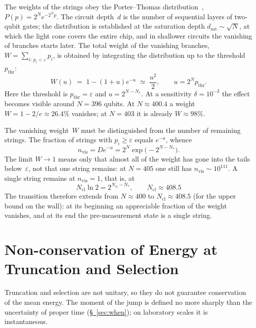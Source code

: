 \documentclass[11pt,a4paper]{article}
\newcommand{\Ncl}{N_{\mathrm{cl}}}
\begin{document}
The weights of the strings obey the Porter--Thomas distribution~\cite{porter1956,boixo2018}, $P(p)=2^N e^{-2^N p}$. The circuit depth~$d$ is the number of sequential layers of two-qubit gates; the distribution is established at the saturation depth $d_{\mathrm{sat}}\sim\sqrt{N}$, at which the light cone covers the entire chip, and in shallower circuits the vanishing of branches starts later. The total weight of the vanishing branches, $W=\sum_{i:\,p_i<\varepsilon}p_i$, is obtained by integrating the distribution up to the threshold~$p_{\mathrm{thr}}$:
\begin{equation}
W(u)
\;=\;
1-(1+u)e^{-u}
\;\simeq\;
\frac{u^2}{2},
\qquad
u=2^N p_{\mathrm{thr}}.
\end{equation}
Here the threshold is $p_{\mathrm{thr}}=\varepsilon$ and $u=2^{N-N_*}$. At a sensitivity $\delta=10^{-3}$ the effect becomes visible around $N=396$ qubits. At $N\approx400.4$ a weight $W=1-2/e\approx26.4\%$ vanishes; at $N=403$ it is already $W\approx98\%$.

The vanishing weight~$W$ must be distinguished from the number of remaining strings. The fraction of strings with $p_i\ge\varepsilon$ equals $e^{-u}$, whence
\begin{equation}
n_{\mathrm{vis}} = D e^{-u} = 2^N \exp\bigl(-2^{N-N_*}\bigr).
\end{equation}
The limit $W\to1$ means only that almost all of the weight has gone into the tails below~$\varepsilon$, not that one string remains: at $N=405$ one still has $n_{\mathrm{vis}}\sim10^{111}$. A single string remains at $n_{\mathrm{vis}}=1$, that is, at
\begin{equation}
\Ncl\ln2 = 2^{\Ncl-N_*},
\qquad
\Ncl\approx408.5
\end{equation}
The transition therefore extends from $N\approx400$ to $\Ncl\approx408.5$ (for the upper bound on the wall): at its beginning an appreciable fraction of the weight vanishes, and at its end the pre-measurement state is a single string.

\section{Non-conservation of Energy at Truncation and Selection}
\label{sec:collapse-duration}

Truncation and selection are not unitary, so they do not guarantee conservation of the mean energy. The moment of the jump is defined no more sharply than the uncertainty of proper time (\hyperref[sec:when]{\S~\ref*{sec:when}}); on laboratory scales it is instantaneous.
\end{document}
